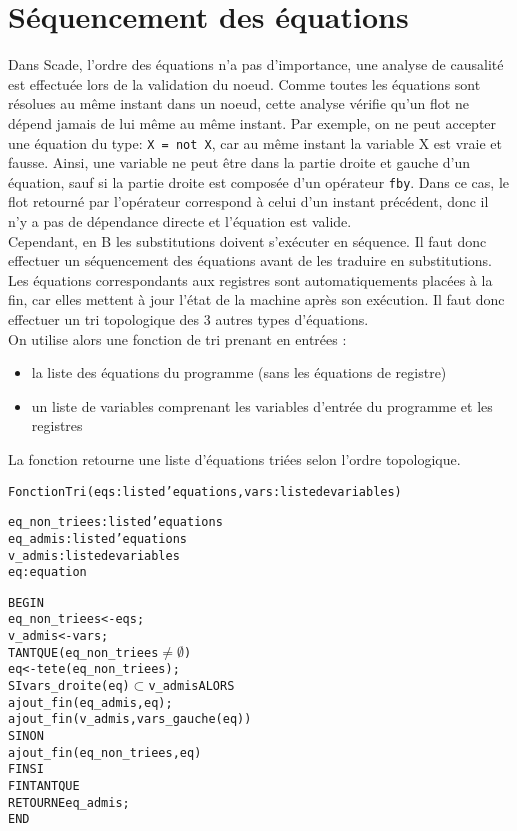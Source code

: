 \section*{Séquencement des équations}

Dans Scade, l'ordre des équations n'a pas d'importance, une analyse de causalité
est effectuée lors de la validation du noeud. Comme toutes les équations sont
résolues au même instant dans un noeud, cette analyse vérifie qu'un flot
ne dépend jamais de lui même au même instant. Par exemple, on ne peut accepter
une équation du type: \texttt{X = not X}, car au même instant la variable X est
vraie et fausse.  Ainsi, une variable ne peut être
dans la partie droite et gauche d'un équation, sauf si la partie droite est
composée d'un opérateur \texttt{fby}. Dans ce cas, le flot retourné par
l'opérateur correspond à celui d'un instant précédent, donc il n'y a pas de
dépendance directe et l'équation est valide. \\

Cependant, en B les substitutions doivent s'exécuter en séquence. Il faut donc
effectuer un séquencement des équations avant de les traduire en substitutions.
Les équations correspondants aux registres sont
automatiquements placées à la fin, car elles mettent à jour l'état de la machine
après son exécution. Il faut donc effectuer un tri topologique des 3 autres
types d'équations.\\
On utilise alors une fonction de tri prenant en entrées :
\begin{itemize}
\item la liste des équations du programme (sans les équations de registre)
\item un liste de variables comprenant les variables d'entrée du programme et
les registres 
\end{itemize}
La fonction retourne une liste d'équations triées selon l'ordre
topologique.
\newpage
\begin{alltt}
Fonction Tri (eqs: liste d'equations, vars: liste de variables)

eq\_non\_triees : liste d'equations
eq\_admis : liste d'equations
v\_admis : liste de variables 
eq : equation

BEGIN
 eq\_non\_triees <- eqs;
 v\_admis <- vars;
 TANT QUE (eq\_non\_triees \(\neq \emptyset \)) 
    eq <- tete(eq\_non\_triees);
    SI vars\_droite(eq) \(\subset\) v\_admis ALORS
       ajout\_fin(eq\_admis, eq);
       ajout\_fin(v\_admis, vars\_gauche(eq))
    SINON
       ajout\_fin(eq\_non\_triees, eq)
    FIN SI
 FIN TANT QUE
 RETOURNE eq\_admis;
END

\end{alltt}

